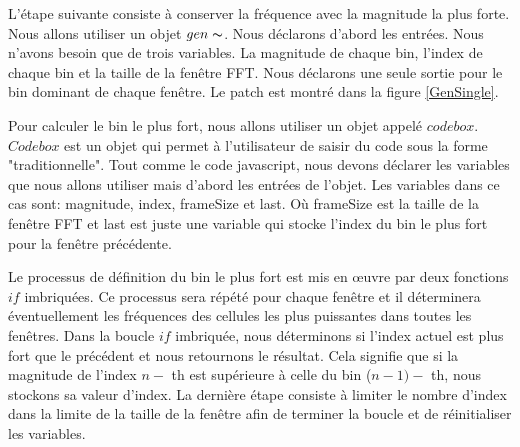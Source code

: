 L'étape suivante consiste à conserver la fréquence avec la magnitude la plus forte. Nous allons utiliser un objet $ gen \thicksim $. Nous déclarons d'abord les entrées. Nous n'avons besoin que de trois variables. La magnitude de chaque bin, l’index de chaque bin et la taille de la fenêtre FFT. Nous déclarons une seule sortie pour le bin dominant de chaque fenêtre. Le patch est montré dans la figure \ref{GenSingle}.

Pour calculer le bin le plus fort, nous allons utiliser un objet appelé $ codebox $. $ Codebox $ est un objet qui permet à l'utilisateur de saisir du code sous la forme "traditionnelle". Tout comme le code javascript, nous devons déclarer les variables que nous allons utiliser mais d’abord les entrées de l’objet. Les variables dans ce cas sont: magnitude, index, frameSize et last. Où frameSize est la taille de la fenêtre FFT et last est juste une variable qui stocke l'index du bin le plus fort pour la fenêtre précédente.

Le processus de définition du bin le plus fort est mis en œuvre par deux fonctions $if$ imbriquées. Ce processus sera répété pour chaque fenêtre et il déterminera éventuellement les fréquences des cellules les plus puissantes dans toutes les fenêtres. Dans la boucle $if$ imbriquée, nous déterminons si l'index actuel est plus fort que le précédent et nous retournons le résultat. Cela signifie que si la magnitude de l'index $ n- $ th est supérieure à celle du bin ($ n-1) - $ th, nous stockons sa valeur d'index. La dernière étape consiste à limiter le nombre d'index dans la limite de la taille de la fenêtre afin de terminer la boucle et de réinitialiser les variables.


